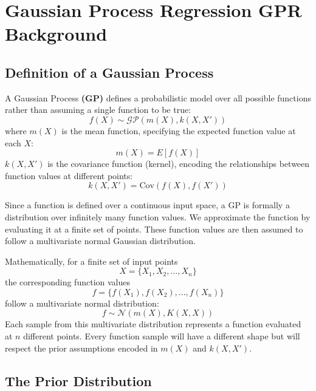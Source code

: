 \documentclass{article}
\begin{document}
\section{Gaussian Process Regression \textbf{GPR} Background}

\subsection*{Definition of a Gaussian Process}

A Gaussian Process \textbf{(GP)} defines a probabilistic model over all possible functions rather than assuming a single function to be true:
\[
f(X) \sim \mathcal{GP} (m(X), k(X, X'))
\]
where \( m(X) \) is the mean function, specifying the expected function value at each \( X \):
\[
    m(X) = {E}[f(X)]
\]
 \( k(X, X') \) is the covariance function (kernel), encoding the relationships between function values at different points:
\[
    k(X, X') = \text{Cov}(f(X), f(X'))
\]

\noindent
Since a function is defined over a continuous input space, a GP is formally a distribution over infinitely many function values. We approximate the function by evaluating it at a finite set of points. These function values are then assumed to follow a multivariate normal Gaussian distribution.

\noindent
Mathematically, for a finite set of input points  \[ X = \{X_1, X_2, \dots, X_n\} \] the corresponding function values
\[
f = \{f(X_1),f(X_2),...,f(X_n)\}
\]
follow a multivariate normal distribution:
\[
f \sim \mathcal{N}(m(X), K(X, X))
\]
Each sample from this multivariate distribution represents a function evaluated at \( n \) different points. Every function sample will have a different shape but will respect the prior assumptions encoded in \( m(X) \) and \( k(X, X') \).

\subsection{The Prior Distribution}
\end{document}
